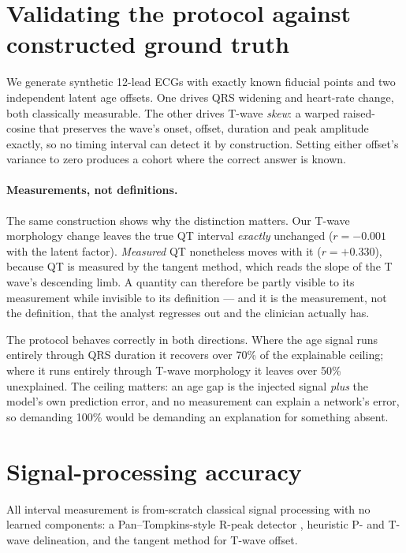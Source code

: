 \documentclass{article}
\begin{document}
\appendix
\section{Validating the protocol against constructed ground truth}
\label{app:synthetic}

We generate synthetic 12-lead ECGs with exactly known fiducial points and two
independent latent age offsets. One drives QRS widening and heart-rate change,
both classically measurable. The other drives T-wave \emph{skew}: a warped
raised-cosine that preserves the wave's onset, offset, duration and peak
amplitude exactly, so no timing interval can detect it by construction. Setting
either offset's variance to zero produces a cohort where the correct answer is
known.

\paragraph{Measurements, not definitions.} The same construction shows why the
distinction matters. Our T-wave morphology change leaves the true QT interval
\emph{exactly} unchanged ($r = -0.001$ with the latent factor). \emph{Measured}
QT nonetheless moves with it ($r = +0.330$), because QT is measured by the
tangent method, which reads the slope of the T wave's descending limb. A quantity
can therefore be partly visible to its measurement while invisible to its
definition --- and it is the measurement, not the definition, that the analyst
regresses out and the clinician actually has.

The protocol behaves correctly in both directions. Where the age signal runs
entirely through QRS duration it recovers over 70\% of the explainable ceiling;
where it runs entirely through T-wave morphology it leaves over 50\% unexplained.
The ceiling matters: an age gap is the injected signal \emph{plus} the model's own
prediction error, and no measurement can explain a network's error, so demanding
100\% would be demanding an explanation for something absent.

\section{Signal-processing accuracy}
\label{app:signal}

All interval measurement is from-scratch classical signal processing with no
learned components: a Pan--Tompkins-style R-peak detector
\citep{pan1985qrs}, heuristic P- and T-wave delineation, and the tangent method
for T-wave offset.
\end{document}
